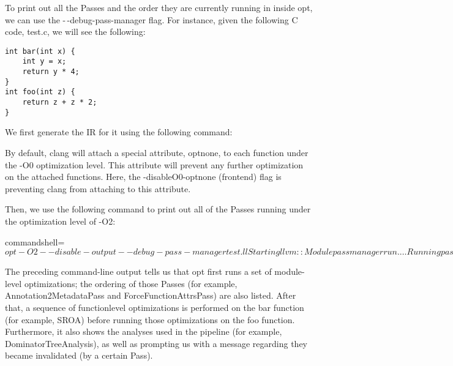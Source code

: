To print out all the Passes and the order they are currently running in inside opt, we can use the -\,-debug-pass-manager flag. For instance, given the following C code, test.c, we will see the following:

\begin{lstlisting}[style=styleCXX]
int bar(int x) {
	int y = x;
	return y * 4;
}
int foo(int z) {
	return z + z * 2;
}
\end{lstlisting}

We first generate the IR for it using the following command:


\begin{tcolorbox}[colback=blue!5!white,colframe=blue!75!black, fonttitle=\bfseries,title=The -disable-O0-optnone flag]	
\hspace*{0.7cm}By default, clang will attach a special attribute, optnone, to each function under the -O0 optimization level. This attribute will prevent any further optimization on the attached functions. Here, the -disableO0-optnone (frontend) flag is preventing clang from attaching to this attribute.
\end{tcolorbox}

Then, we use the following command to print out all of the Passes running under the optimization level of -O2:

\begin{tcblisting}{commandshell={}}
$ opt -O2 --disable-output --debug-pass-manager test.ll
Starting llvm::Module pass manager run.
…
Running pass: Annotation2MetadataPass on ./test.ll
Running pass: ForceFunctionAttrsPass on ./test.ll
…
Starting llvm::Function pass manager run.
Running pass: SimplifyCFGPass on bar
Running pass: SROA on bar
Running analysis: DominatorTreeAnalysis on bar
Running pass: EarlyCSEPass on bar
…
Finished llvm::Function pass manager run.
…
Starting llvm::Function pass manager run.
Running pass: SimplifyCFGPass on foo
…
Finished llvm::Function pass manager run.
Invalidating analysis: VerifierAnalysis on ./test.ll
… $
\end{tcblisting}

The preceding command-line output tells us that opt first runs a set of module-level optimizations; the ordering of those Passes (for example, Annotation2MetadataPass and ForceFunctionAttrsPass) are also listed. After that, a sequence of functionlevel optimizations is performed on the bar function (for example, SROA) before running those optimizations on the foo function. Furthermore, it also shows the analyses used in the pipeline (for example, DominatorTreeAnalysis), as well as prompting us with a message regarding they became invalidated (by a certain Pass).

